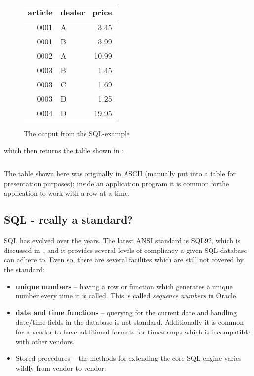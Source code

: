 \begin{figure}[htbp]
  \begin{center}
    \begin{tabular}{|r|l|r|}
\hline\hline
 article & dealer & price\\
\hline
    0001 & A      &  3.45\\
    0001 & B      &  3.99\\
    0002 & A      & 10.99\\
    0003 & B      &  1.45\\
    0003 & C      &  1.69\\
    0003 & D      &  1.25\\
    0004 & D      & 19.95\\
\hline
    \end{tabular}

    \caption{The output from the SQL-example}
    \label{fig:mysql-tutorial-example-output}
  \end{center}
\end{figure}
which then returns the table shown in :

\begin{verbatim}
\end{verbatim}

The table shown here was originally in ASCII (manually put into a
table for presentation purposes); inside an application program it is
common forthe application to work with a row at a time.


\subsection{SQL - really a standard?}
\label{sec:how-standardized-is-sql}

SQL has evolved over the years.  The latest ANSI standard is SQL92,
which is discussed in~\cite{understanding-the-new-sql}, and it
provides several levels of compliancy a given SQL-database can adhere
to.  Even so, there are several facilites which are still not covered
by the standard:

\begin{itemize}
\item \textbf{unique numbers} -- having a row or function which
  generates a unique number every time it is called.  This is called
  \textit{sequence numbers} in Oracle.
\item \textbf{date and time functions} -- querying for the current
  date and handling date/time fields in the database is not standard.
  Additionally it is common for a vendor to have additional formats
  for timestamps which is incompatible with other vendors.
\item \textsf{Stored procedures} -- the methods for extending the core
  SQL-engine varies wildly from vendor to vendor.
\end{itemize}

